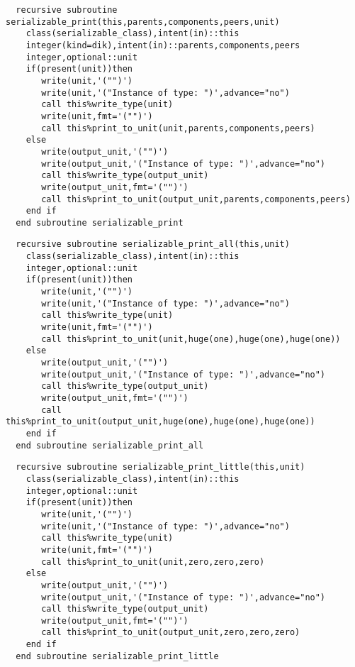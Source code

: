 \begin{Verbatim}
  recursive subroutine serializable_print(this,parents,components,peers,unit)
    class(serializable_class),intent(in)::this
    integer(kind=dik),intent(in)::parents,components,peers
    integer,optional::unit
    if(present(unit))then
       write(unit,'("")')
       write(unit,'("Instance of type: ")',advance="no")
       call this%write_type(unit)
       write(unit,fmt='("")')
       call this%print_to_unit(unit,parents,components,peers)
    else
       write(output_unit,'("")')
       write(output_unit,'("Instance of type: ")',advance="no")
       call this%write_type(output_unit)
       write(output_unit,fmt='("")')
       call this%print_to_unit(output_unit,parents,components,peers)
    end if
  end subroutine serializable_print
\end{Verbatim}

\begin{Verbatim}
  recursive subroutine serializable_print_all(this,unit)
    class(serializable_class),intent(in)::this
    integer,optional::unit
    if(present(unit))then
       write(unit,'("")')
       write(unit,'("Instance of type: ")',advance="no")
       call this%write_type(unit)
       write(unit,fmt='("")')
       call this%print_to_unit(unit,huge(one),huge(one),huge(one))
    else
       write(output_unit,'("")')
       write(output_unit,'("Instance of type: ")',advance="no")
       call this%write_type(output_unit)
       write(output_unit,fmt='("")')
       call this%print_to_unit(output_unit,huge(one),huge(one),huge(one))
    end if
  end subroutine serializable_print_all
\end{Verbatim}

\begin{Verbatim}
  recursive subroutine serializable_print_little(this,unit)
    class(serializable_class),intent(in)::this
    integer,optional::unit
    if(present(unit))then
       write(unit,'("")')
       write(unit,'("Instance of type: ")',advance="no")
       call this%write_type(unit)
       write(unit,fmt='("")')
       call this%print_to_unit(unit,zero,zero,zero)
    else
       write(output_unit,'("")')
       write(output_unit,'("Instance of type: ")',advance="no")
       call this%write_type(output_unit)
       write(output_unit,fmt='("")')
       call this%print_to_unit(output_unit,zero,zero,zero)
    end if
  end subroutine serializable_print_little
\end{Verbatim}

